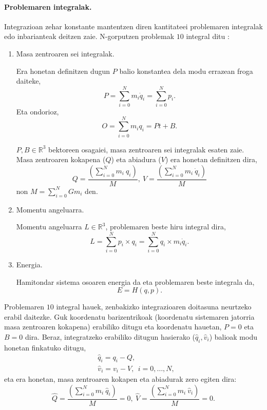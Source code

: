 \paragraph*{Problemaren integralak.}
Integrazioan zehar konstante mantentzen diren kantitateei problemaren integralak edo inbarianteak deitzen zaie. N-gorputzen problemak $10$ integral ditu \cite{Klioner2016}:
\begin{enumerate}


\item Masa zentroaren sei integralak.

Era honetan definitzen dugun $P$ balio konstantea dela modu errazean froga daiteke, 
\begin{equation*}
P=\sum_{i=0}^{N} m_i \dot{q}_i=\sum_{i=0}^{N} p_i. 
\end{equation*}
Eta ondorioz,
\begin{equation*}
O=\sum_{i=0}^{N} m_i {q}_i=Pt+B. 
\end{equation*}

$P,B \in \mathbb{R}^3$ bektoreen osagaiei, masa zentroaren sei integralak esaten zaie. Masa zentroaren kokapena ($Q$) eta abiadura ($V$)  era honetan definitzen dira, 
\begin{equation*}
Q=\frac{\left(\sum\limits_{i=0}^{N} m_i \ q_i\right)}{M}, \ V=\frac{\left(\sum\limits_{i=0}^{N} m_i \ \dot{q}_i\right)}{M}
\end{equation*}
non $M=\sum\limits_{i=0}^{N}Gm_i$ den.


\item Momentu angeluarra.

Momentu angeluarra $L\in \mathbb{R}^3$, problemaren beste hiru integral dira, 
\begin{equation*}
L=\sum_{i=0}^{N} p_i \times q_i=\sum_{i=0}^{N} q_i \times m_i \dot{q}_i.
\end{equation*}

\item Energia.

Hamitondar sistema osoaren energia da eta problemaren beste integrala da,
\begin{equation*}
E=H(q,p).
\end{equation*}

\end{enumerate}

Problemaren $10$ integral hauek, zenbakizko integrazioaren doitasuna neurtzeko erabil daitezke. Guk koordenatu barizentrikoak (koordenatu sistemaren jatorria masa zentroaren kokapena) erabiliko ditugu eta koordenatu hauetan, $P=0$ eta $B=0$ dira. Beraz, integratzeko erabiliko ditugun hasierako ($\hat{q}_i,\hat{v}_i$) balioak  modu honetan finkatuko ditugu,
\begin{align*}
&\hat{q}_i=q_i-Q, \\
&\hat{v}_i=v_i-V, \ \ i=0,\dots,N,
\end{align*}
eta era honetan, masa zentroaren kokapen eta abiadurak zero egiten dira:
\begin{equation*}
\hat{Q}=\frac{\left(\sum\limits_{i=0}^{N} m_i \ \hat{q}_i\right)}{M}=0, \ \hat{V}=\frac{\left(\sum\limits_{i=0}^{N} m_i \ \hat{v}_i\right)}{M}=0.
\end{equation*}

